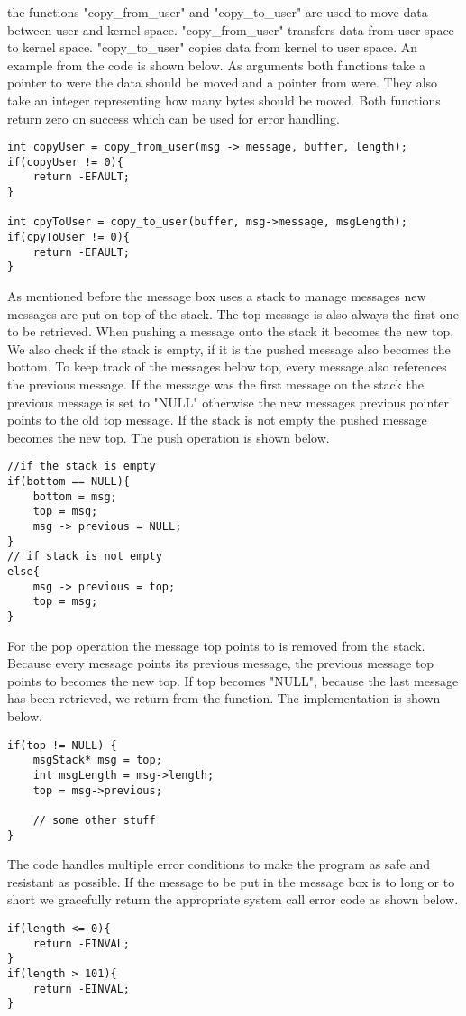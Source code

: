 \documentclass[12pt,a4paper]{report}
\begin{document}
the functions "copy\_from\_user" and "copy\_to\_user" are used to move data between user and kernel space. "copy\_from\_user" transfers data from user space to kernel space. "copy\_to\_user" copies data from kernel to user space. An example from the code is shown below. As arguments both functions take a pointer to were the data should be moved and a pointer from were. They also take an integer representing how many bytes should be moved. Both functions return zero on success which can be used for error handling.
\begin{verbatim}
int copyUser = copy_from_user(msg -> message, buffer, length);
if(copyUser != 0){
    return -EFAULT;
}
 
int cpyToUser = copy_to_user(buffer, msg->message, msgLength);
if(cpyToUser != 0){
    return -EFAULT;
}
\end{verbatim}
As mentioned before the message box uses a stack to manage messages new messages are put on top of the stack. The top message is also always the first one to be retrieved. When pushing a message onto the stack it becomes the new top. We also check if the stack is empty, if it is the pushed message also becomes the bottom. To keep track of the messages below top, every message also references the previous message. If the message was the first message on the stack the previous message is set to "NULL" otherwise the new messages previous pointer points to the old top message. If the stack is not empty the pushed message becomes the new top. The push operation is shown below.
\begin{verbatim}
//if the stack is empty
if(bottom == NULL){
    bottom = msg;
    top = msg;
    msg -> previous = NULL;
}
// if stack is not empty
else{
    msg -> previous = top;
    top = msg;
}
\end{verbatim}
For the pop operation the message top points to is removed from the stack. Because every message points its previous message, the previous message top points to becomes the new top. If top becomes "NULL", because the last message has been retrieved, we return from the function. The implementation is shown below.
\begin{verbatim}
if(top != NULL) {
    msgStack* msg = top;
    int msgLength = msg->length;
    top = msg->previous;
    
    // some other stuff
}
\end{verbatim}

The code handles multiple error conditions to make the program as safe and resistant as possible. If the message to be put in the message box is to long or to short we gracefully return the appropriate system call error code as shown below.
\begin{verbatim}
if(length <= 0){
    return -EINVAL;
}
if(length > 101){
    return -EINVAL;
}
\end{verbatim}
\end{document}
